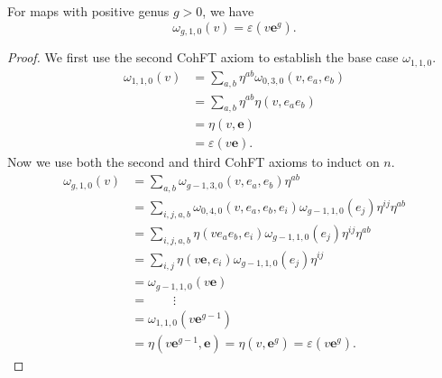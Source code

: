 \documentclass[10pt,a4paper]{amsart}
\newcommand{\be}{\begin{equation}}
\newcommand{\ee}{\end{equation}}
\newcommand{\eps}{\varepsilon}
\newcommand{\eul}{\mathbf{e}}
\begin{document}
\begin{Prop}\label{prop:g10case}
    For maps with positive genus $g>0$, we have
    \be\label{eqn:g10case}
    \omega_{g,1,0}(v)=\eps(v\eul^g).
    \ee
\end{Prop}

\begin{proof}
    We first use the second CohFT axiom to establish the base case $\omega_{1,1,0}.$
    \begin{align*}
        \omega_{1,1,0}(v)&=\sum_{a,b}\eta^{ab}\omega_{0,3,0}(v,e_a,e_b)\\
        &=\sum_{a,b}\eta^{ab}\eta(v,e_ae_b)\\
        &=\eta(v,\eul)\\
        &=\eps(v\eul).
    \end{align*}
    \noindent Now we use both the second and third CohFT axioms to induct on $n$.
    \begin{align*}
        \omega_{g,1,0}(v)&=\sum_{a,b}\omega_{g-1,3,0}(v,e_a,e_b)\eta^{ab}\\
        &=\sum_{i,j,a,b}\omega_{0,4,0}(v,e_a,e_b,e_i)\omega_{g-1,1,0}(e_j)\eta^{ij}\eta^{ab}\\
        &=\sum_{i,j,a,b}\eta(ve_ae_b,e_i)\omega_{g-1,1,0}(e_j)\eta^{ij}\eta^{ab}\\
        &=\sum_{i,j}\eta(v\eul,e_i)\omega_{g-1,1,0}(e_j)\eta^{ij}\\
        &=\omega_{g-1,1,0}(v\eul)\\
        &=\qquad\vdots\\
        &=\omega_{1,1,0}(v\eul^{g-1})\\
        &=\eta(v\eul^{g-1},\eul)=\eta(v,\eul^g)=\eps(v\eul^g).
    \end{align*}
\end{proof}
\end{document}
